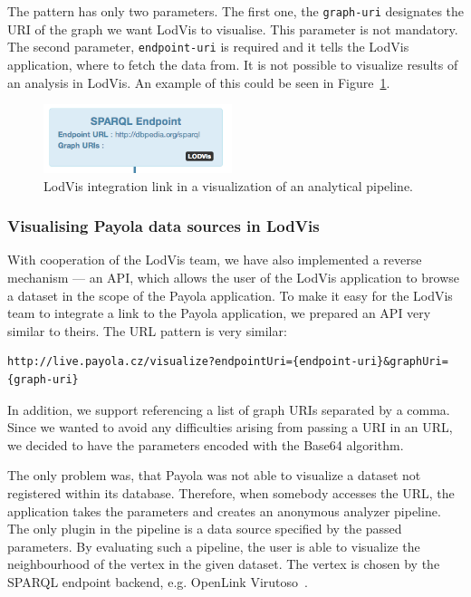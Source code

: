 The pattern has only two parameters. The first one, the \texttt{graph-uri} 
designates the URI of the graph we want LodVis to visualise. This parameter is 
not mandatory. The second parameter, \texttt{endpoint-uri} is required and it 
tells the LodVis application, where to fetch the data from. It is not possible 
to visualize results of an analysis in LodVis. An example of this could
be seen in Figure~\ref{fig:lodvis-int}.

\begin{figure}
	\centering
	\includegraphics[width=55mm]{img/lodvis-int.png}
	\caption{LodVis integration link in a visualization of an analytical pipeline.}
	\label{fig:lodvis-int}
\end{figure}


\subsubsection{Visualising Payola data sources in LodVis}
With cooperation of the LodVis team, we have also implemented a reverse 
mechanism --- an API, which allows the user of the LodVis application to browse a 
dataset in the scope of the Payola application. To make it easy for the LodVis 
team to integrate a link to the Payola application, we prepared an API very 
similar to theirs. The URL pattern is very similar:

{  \scriptsize
\begin{verbatim}
http://live.payola.cz/visualize?endpointUri={endpoint-uri}&graphUri={graph-uri}
\end{verbatim}
}

In addition, we support referencing a list of graph URIs separated by a comma. Since 
we wanted to avoid any difficulties arising from passing a URI in an 
URL, we decided to have the parameters encoded with the Base64 algorithm.

The only problem was, that Payola was not able to visualize a dataset not registered
within its database. Therefore, when somebody accesses the 
URL, the application takes the parameters and creates an anonymous analyzer 
pipeline. The only plugin in the pipeline is a data source specified by the 
passed parameters. By evaluating such a pipeline, the user is able to visualize 
the neighbourhood of the vertex in the given dataset. The vertex is chosen by the 
SPARQL endpoint backend, e.g. OpenLink Virutoso~\cite{virtuoso}.

